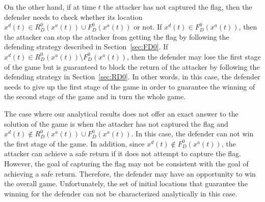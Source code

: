 On the other hand, if at time $t$ the attacker has not captured the flag, then the defender needs to check whether its location $x^d(t)\in R_D^0(x^a(t))\cup F_D^0(x^a(t))$ or not. If $x^d(t)\in F_D^0(x^a(t))$, then the attacker can stop the attacker from getting the flag by following the defending strategy described in Section~\ref{sec:FD0}. If $x^d(t)\in R_D^0(x^a(t))\setminus F_D^0(x^a(t))$, then the defender may lose the first stage of the game but is guaranteed to block the return of the attacker by following the defending strategy in Section~\ref{sec:RD0}. In other words, in this case, the defender needs to give up the first stage of the game in order to guarantee the winning of the second stage of the game and in turn the whole game. 

The case where our analytical results does not offer an exact answer to the solution of the game is when the attacker has not captured the flag and $x^d(t)\notin R_D^0(x^a(t))\cup F_D^0(x^a(t))$. In this case, the defender can not win the first stage of the game. In addition, since $x^d(t)\notin F_D^0(x^a(t))$, the attacker can achieve a safe return if it does not attempt to capture the flag. However, the goal of capturing the flag may not be consistent with the goal of achieving a safe return. Therefore, the defender may have an opportunity to win the overall game. Unfortunately, the set of initial locations that guarantee the winning for the defender can not be characterized analytically in this case.